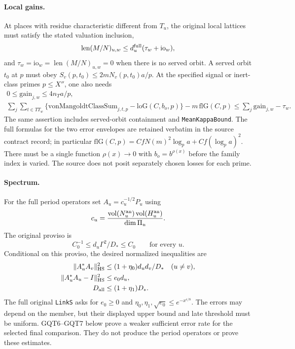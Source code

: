 \documentclass[11pt,a4paper]{article}
\numberwithin{equation}{section}
\theoremstyle{remark}\newtheorem{remark}[theorem]{Remark}
\begin{document}
\paragraph{Local gains.}
At places with residue characteristic different from $T_u$, the
original local lattices must satisfy the stated valuation inclusion,
\[
 \operatorname{len}(M/N)_{u,\allowbreak{} w}\le d_u^{\rm full}
                                      (\tau_w+\mathrm{io}_w),
\]
and $\tau_w=\mathrm{io}_w=\operatorname{len}(M/N)_{u,\allowbreak{} w}=0$
when there is no served orbit. A served orbit $t_0$ at $p$ must obey
$S_v(p,\allowbreak{} t_0)\le2mN_v(p,\allowbreak{} t_0)a/p$. At the specified signal or
inert-class primes $p\le X''$, one also needs
\begin{gather}
       0\le\mathrm{gain}_{j,\allowbreak{} w}\le4n_Ta/p,                 \label{eq:gqt-gain1}\\
 \sum_j\sum_{t\in TT_w}
  \{\mathrm{vonMangoldtClassSum}_{j,\allowbreak{} t,\allowbreak{} p}-\mathrm{loG}(C,\allowbreak{} b_o,\allowbreak{} p)\}
       -m\,\mathrm{flG}(C,\allowbreak{} p)
   \le\sum_j\mathrm{gain}_{j,\allowbreak{} w}-\tau_w.                 \label{eq:gqt-gain2}
\end{gather}
The same assertion includes served-orbit containment and
\texttt{Mean\allowbreak Kappa\allowbreak Bound}. The full formulas for the two error
envelopes are retained verbatim in the source contract record;
in particular $\mathrm{flG}(C,\allowbreak{} p)=CfN(m)^2\log_p a+
Cf(\log_p a)^2$. There must be a single function $\rho(x)\to0$
with $b_o=b^{\rho(x)}$ before the family index is varied.
The source does not posit separately chosen losses for each prime.

\paragraph{Spectrum.}
For the full period operators set $A_u=c_u^{-1/2}P_u$ using
\[
 c_u=\frac{\operatorname{vol}(N_u^{\rm an})
                 \operatorname{vol}(H_u^{\rm an})}{\dim\Pi_u}.
\]
The original proviso is
\begin{equation}\label{eq:gqt-proviso}
 C_0^{-1}\le d_u\Gamma^2/D_*\le C_0\qquad\text{for every }u.
\end{equation}
Conditional on this proviso, the desired normalized inequalities are
\begin{align}
 \|A_u^*A_v\|_{\mathrm{HS}}^2
     &\le(1+\eta_0)d_ud_v/D_*\quad(u\ne v),             \label{eq:gqt-off}\\
 \|A_u^*A_u-I\|_{\mathrm{HS}}^2&\le e_0d_u,            \label{eq:gqt-diag}\\
 D_{\rm all}&\le(1+\eta_1)D_*.                         \label{eq:gqt-dimension}
\end{align}
The full original \texttt{Link\allowbreak S} asks for $e_0\ge0$ and
$\eta_0,\eta_1,\sqrt{e_0}\le e^{-x^{\epsilon/8}}$.
The errors may depend on the member, but their displayed upper bound
and late threshold must be uniform. GQT6--GQT7 below prove a weaker
sufficient error rate for the selected final comparison. They do not
produce the period operators or prove these estimates.
\end{document}
